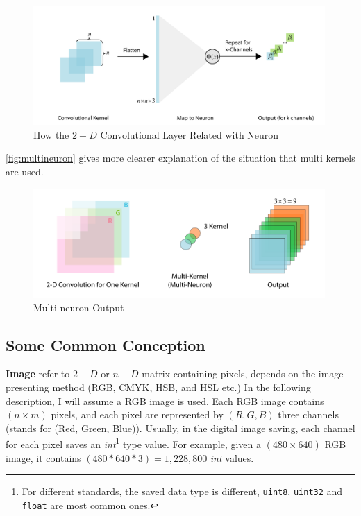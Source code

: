 \begin{spacing}{1.5}
\begin{figure}[ht]
\centering
\includegraphics[width=0.99\textwidth, fbox]{Chapter2/convtoneuron.pdf}
\caption{How the $2-D$ Convolutional Layer Related with Neuron}
\label{fig:convtoneuron} 
\end{figure}

\autoref{fig:multineuron} gives more clearer explanation of the situation that multi kernels are used.

\begin{figure}[ht]
\centering
\includegraphics[width=0.99\textwidth, fbox]{Chapter2/multineuron.pdf}
\caption{Multi-neuron Output}
\label{fig:multineuron} 
\end{figure}

\subsection{Some Common Conception}

\textbf{Image} refer to $2-D$ or $n-D$ matrix containing pixels, depends on the image presenting method (RGB, CMYK, HSB, and HSL etc.) In the following description, I will assume a RGB image is used. Each RGB image contains $(n \times m)$ pixels, and each pixel are represented by $(R,G,B)$ three channels (stands for (Red, Green, Blue)). Usually, in the digital image saving, each channel for each pixel saves an \textit{int}\footnote{For different standards, the saved data type is different, \texttt{uint8}, \texttt{uint32} and \texttt{float} are most common ones.} type value. For example, given a $(480 \times 640)$ RGB image, it contains $(480 * 640 * 3)=1,228,800$ \textit{int} values.


\end{spacing}
